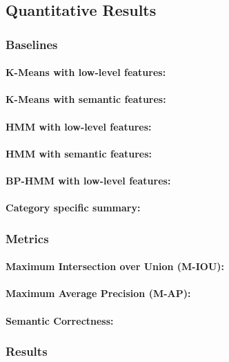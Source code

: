 \subsection{Quantitative Results}
\subsubsection{Baselines}
\paragraph{K-Means with low-level features:}
\paragraph{K-Means with semantic features:}
\paragraph{HMM with low-level features:}
\paragraph{HMM with semantic features:}
\paragraph{BP-HMM with low-level features:}
\paragraph{Category specific summary\cite{potapov2014category}:}


\subsubsection{Metrics}
\paragraph{Maximum Intersection over Union (M-IOU):}
\paragraph{Maximum Average Precision (M-AP):}
\paragraph{Semantic Correctness:}

\subsubsection{Results}
